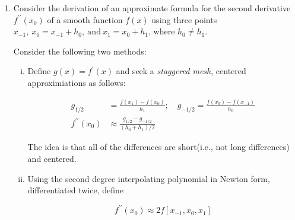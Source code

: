 \documentclass[12pt]{article}
\begin{document}
\begin{enumerate}
\begin{enumerate}
{\bf Solution:}

\item Use your formula to provide approximations to $f^{\prime \prime \prime}(0)$ for the function $f(x) = e^{x}$ employing values $h = \{ 10^{-1}, 10^{-2}, \ldots, 10^{-9}\}$, with the default ${\tt Matlab}$ arithmetic. Verify that for the larger values of $h$ your formula is indeed second order accurate. Which value of $h$ gives the closest approximation to $e^{0} = 1$?

{\bf Solution:}

\item For the formual that you derived in (a), how does the roundoff error behave as a function of $h$, as $h\rightarrow 0$.

{\bf Solution:}

\item How would you go about obtaining a forth order formula for $f^{\prime \prime \prime}(x_{0})$ in general? (You don't have to actually derive it: just describe in one or two sentences.) How many points would this formula require?

{\bf Solution:}
\end{enumerate}

\item Consider the derivation of an approximate formula for the second derivative $f^{\prime \prime}(x_{0})$ of a smooth function $f(x)$ using three points $x_{-1},\ x_{0}=x_{-1} + h_{0},\ \text{and}\ x_{1}=x_{0}+h_{1}$, where $h_{0} \neq h_{1}$. 

Consider the following two methods:

\begin{enumerate}[i.]
\item Define $g(x) = f^{\prime}(x)$ and seek a {\em staggered mesh}, centered approximiations as follows:

\begin{align*}
g_{1/2} &= \frac{f(x_{1}) - f(x_{0})}{h_{1}};\quad g_{-1/2} = \frac{f(x_{0}) - f(x_{-1})}{h_{0}}\\
f^{\prime \prime}(x_{0}) &\approx \frac{g_{1/2} - g_{-1/2}}{(h_{0} + h_{1})/2}
\end{align*}

The idea is that all of the differences are short(i.e., not long differences) and centered.

\item Using the second degree interpolating polynomial in Newton form, differentiated twice, define

\[
f^{\prime \prime}(x_{0}) \approx 2f[x_{-1}, x_{0}, x_{1}]
\]


\end{enumerate}
\end{enumerate}
\end{document}
